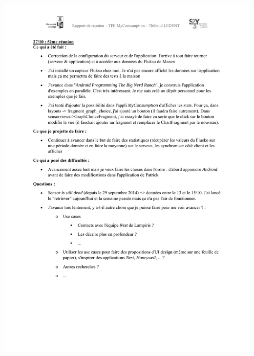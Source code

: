\documentclass[a4paper, oneside, 11pt]{book}
\begin{document}
\includegraphics[width=1\textwidth]{reports_NB_Part5.pdf}
\newpage
\end{document}
